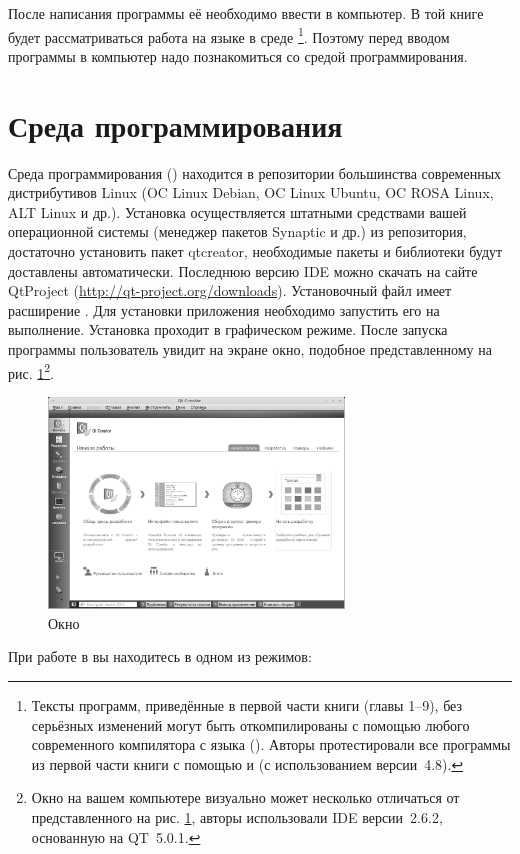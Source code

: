После написания программы её необходимо ввести в компьютер. В той книге будет рассматриваться работа на языке  в
среде \footnote{Тексты программ, приведённые в первой части книги (главы 1--9), без серьёзных изменений
могут быть откомпилированы с помощью любого современного компилятора с языка (). Авторы протестировали все
программы из первой части книги с помощью   и   (с использованием  версии~4.8).}. 
Поэтому перед
вводом программы в компьютер надо познакомиться со средой программирования.

\section[Среда программирования \Sys{Qt Creator}]{Среда программирования }
Среда программирования  
() находится в репозитории
большинства современных дистрибутивов Linux (OC Linux Debian, OC Linux Ubuntu, OC ROSA Linux, ALT Linux и др.).
Установка осуществляется штатными средствами вашей операционной системы (менеджер пакетов Synaptic и др.) из
репозитория, достаточно установить пакет qtcreator, необходимые пакеты и библиотеки будут доставлены  автоматически.
Последнюю версию IDE  можно скачать на сайте QtProject (\url{http://qt-project.org/downloads}). 
Установочный файл имеет расширение . Для установки приложения необходимо запустить его на выполнение.
Установка проходит в графическом режиме. После запуска программы пользователь увидит на экране окно, подобное
представленному на рис. \ref{ch01:refDrawing0}\footnote{Окно на вашем компьютере визуально может несколько отличаться от
представленного на рис. \ref{ch01:refDrawing0}, авторы использовали IDE  версии~2.6.2, основанную на QT~5.0.1.}.


\begin{figure}[htb]
\begin{center}
\includegraphics[width=0.7\textwidth]{img/ris_1_1_rus}
\caption{Окно }
\label{ch01:refDrawing0}
\end{center}
\end{figure}
При работе в  вы находитесь в одном из режимов:

